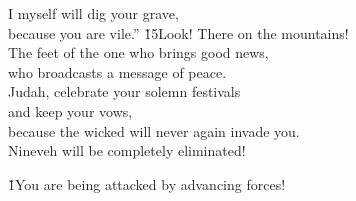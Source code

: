 \begin{poetry}
\poemll    I myself will dig your grave, \\
\poemlll       because you are vile.''
\poeml \v{15}Look! There on the mountains! \\
\poemll    The feet of the one who brings good news, \\
\poemlll       who broadcasts a message of peace. \\
\poeml Judah, celebrate your solemn festivals \\
\poemll    and keep your vows, \\
\poeml because the wicked will never again invade you. \\
\poemll    Nineveh will be completely eliminated!
\end{poetry}

\v{1}You are being attacked by advancing forces!

